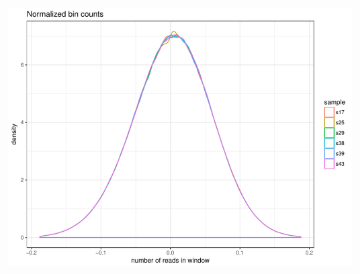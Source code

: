 \begin{figure}[htp]
\begin{subfigure}[b]{.3\textwidth}
    \includegraphics[width=\linewidth,page=4]{figures/twin-biasWGS-QDNAseq.pdf}
    \caption{}
  \end{subfigure}


\end{figure}
